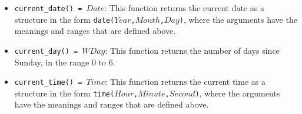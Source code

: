 \begin{itemize}
\item \texttt{current\_date() = $Date$}: This function returns the current date as a structure in the form \texttt{date($Year$,$Month$,$Day$)}, where the arguments have the meanings and ranges that are defined above.

\item \texttt{current\_day() = $WDay$}: This function returns the number of days since Sunday, in the range 0 to 6. 

\item \texttt{current\_time() = $Time$}: This function returns the current time as a structure in the form \texttt{time($Hour$,$Minute$,$Second$)}, where the arguments have the meanings and ranges that are defined above.

\end{itemize}
\ignore{

}
